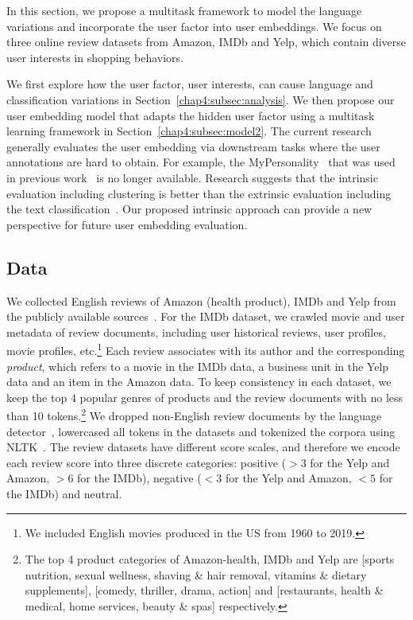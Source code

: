 In this section, we propose a multitask framework to model the language variations and incorporate the user factor into user embeddings.
We focus on three online review datasets from Amazon, IMDb and Yelp, which contain diverse user interests in shopping behaviors.

We first explore how the user factor, user interests, can cause language and classification variations in Section~\ref{chap4:subsec:analysis}.
We then propose our user embedding model that adapts the hidden user factor using a multitask learning framework in Section~\ref{chap4:subsec:model2}.
The current research~\cite{pan2019social} generally evaluates the user embedding via downstream tasks where the user annotations are hard to obtain. 
For example, the MyPersonality~\cite{kosinski2015facebook} that was used in previous work~\cite{ding2017multi, farnadi2018user, pan2019social} is no longer available. 
Research suggests that the intrinsic evaluation including clustering is better than the extrinsic evaluation including the text classification~\cite{schnabel2015evaluation}.
Our proposed intrinsic approach can provide a new perspective for future user embedding evaluation.


\subsection{Data}
\label{chap4:subsec:data2}

We collected English reviews of Amazon (health product), IMDb and Yelp from the publicly available sources~\cite{he2016ups, yelp_2019, imdb2020dataset}.
For the IMDb dataset, we crawled movie and user metadata of review documents, including user historical reviews, user profiles, movie profiles, etc.\footnote{We included English movies produced in the US from 1960 to 2019.}
Each review associates with its author and the corresponding \textit{product}, which refers to a movie in the IMDb data, a business unit in the Yelp data and an item in the Amazon data.
To keep consistency in each dataset, we keep the top 4 popular genres of products and the review documents with no less than 10 tokens.\footnote{The top 4 product categories of Amazon-health, IMDb and Yelp are [sports nutrition, sexual wellness, shaving \& hair removal, vitamins \& dietary supplements], [comedy, thriller, drama, action] and [restaurants, health \& medical, home services, beauty \& spas] respectively.}
We dropped non-English review documents by the language detector~\cite{lui2012langid}, lowercased all tokens in the datasets and tokenized the corpora using NLTK~\cite{bird2004nltk}.
The review datasets have different score scales, and therefore we encode each review score into three discrete categories: positive ($>3$ for the Yelp and Amazon, $>6$ for the IMDb), negative ($<3$ for the Yelp and Amazon, $<5$ for the IMDb) and neutral.


